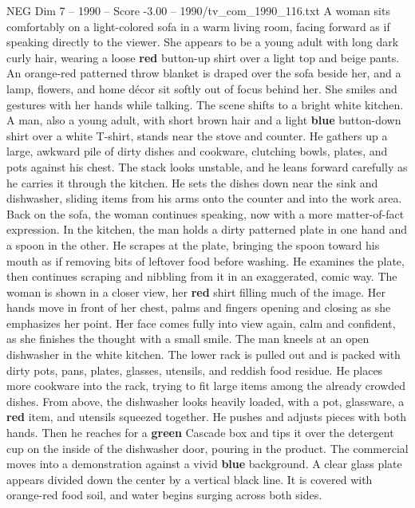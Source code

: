 \begin{textsample}{NEG Dim 7 – 1990 – Score -3.00 – 1990/tv\_com\_1990\_116.txt}  \label{ex:f7_neg_040}
A woman sits comfortably on a light-colored sofa in a warm living room, facing forward as if speaking directly to the viewer.
She appears to be a young adult with long dark curly hair, wearing a loose \textbf{red} button-up shirt over a light top and beige pants.
An orange-red patterned throw blanket is draped over the sofa beside her, and a lamp, flowers, and home décor sit softly out of focus behind her.
She smiles and gestures with her hands while talking.
The scene shifts to a bright white kitchen.
A man, also a young adult, with short brown hair and a light \textbf{blue} button-down shirt over a white T-shirt, stands near the stove and counter.
He gathers up a large, awkward pile of dirty dishes and cookware, clutching bowls, plates, and pots against his chest.
The stack looks unstable, and he leans forward carefully as he carries it through the kitchen.
He sets the dishes down near the sink and dishwasher, sliding items from his arms onto the counter and into the work area.
Back on the sofa, the woman continues speaking, now with a more matter-of-fact expression.
In the kitchen, the man holds a dirty patterned plate in one hand and a spoon in the other.
He scrapes at the plate, bringing the spoon toward his mouth as if removing bits of leftover food before washing.
He examines the plate, then continues scraping and nibbling from it in an exaggerated, comic way.
The woman is shown in a closer view, her \textbf{red} shirt filling much of the image.
Her hands move in front of her chest, palms and fingers opening and closing as she emphasizes her point.
Her face comes fully into view again, calm and confident, as she finishes the thought with a small smile.
The man kneels at an open dishwasher in the white kitchen.
The lower rack is pulled out and is packed with dirty pots, pans, plates, glasses, utensils, and reddish food residue.
He places more cookware into the rack, trying to fit large items among the already crowded dishes.
From above, the dishwasher looks heavily loaded, with a pot, glassware, a \textbf{red} item, and utensils squeezed together.
He pushes and adjusts pieces with both hands.
Then he reaches for a \textbf{green} Cascade box and tips it over the detergent cup on the inside of the dishwasher door, pouring in the product.
The commercial moves into a demonstration against a vivid \textbf{blue} background.
A clear glass plate appears divided down the center by a vertical black line.
It is covered with orange-red food soil, and water begins surging across both sides.

\end{textsample}
